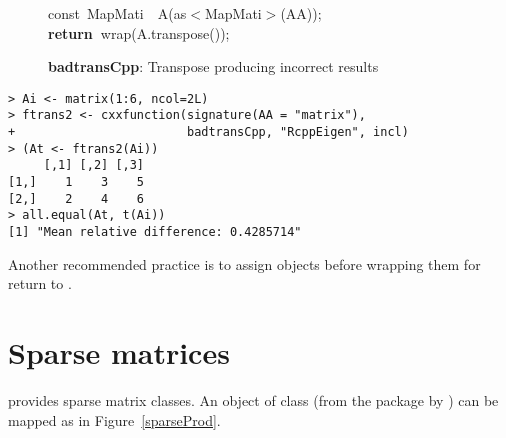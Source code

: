 \documentclass[shortnames,article]{jss}
\newcommand{\hlstd}[1]{\textcolor[rgb]{0,0,0}{#1}}
\newcommand{\hlopt}[1]{\textcolor[rgb]{0,0,0}{#1}}
\newcommand{\hlkwa}[1]{\textcolor[rgb]{0.61,0.13,0.93}{\bf{#1}}}
\newcommand{\hlkwb}[1]{\textcolor[rgb]{0.13,0.54,0.13}{#1}}
\newcommand{\hlkwd}[1]{\textcolor[rgb]{0,0,0}{#1}}
\begin{document}
\begin{figure}[htb]
  \noindent
  \ttfamily
  \hlstd{}\hlkwb{const\ }\hlstd{MapMati}\hlstd{\ \ }\hlstd{}\hlkwd{A}\hlstd{}\hlopt{(}\hlstd{as}\hlopt{$<$}\hlstd{MapMati}\hlopt{$>$(}\hlstd{AA}\hlopt{));}\hspace*{\fill}\\
  \hlstd{}\hlkwa{return\ }\hlstd{}\hlkwd{wrap}\hlstd{}\hlopt{(}\hlstd{A}\hlopt{.}\hlstd{}\hlkwd{transpose}\hlstd{}\hlopt{());}\hlstd{}\hspace*{\fill}\\
  \mbox{}
  \normalfont
  \normalsize
  \caption{\textbf{badtransCpp}: Transpose producing incorrect results}
  \label{badtrans}
\end{figure}
\begin{verbatim}
> Ai <- matrix(1:6, ncol=2L)
> ftrans2 <- cxxfunction(signature(AA = "matrix"), 
+                        badtransCpp, "RcppEigen", incl)
> (At <- ftrans2(Ai))
     [,1] [,2] [,3]
[1,]    1    3    5
[2,]    2    4    6
> all.equal(At, t(Ai))
[1] "Mean relative difference: 0.4285714"
\end{verbatim}

Another recommended practice is to assign objects before wrapping them
for return to .

\section{Sparse matrices}
\label{sec:sparse}

 provides sparse matrix classes.  An  object of
class  (from the  package by
\citet{CRAN:Matrix}) can be mapped as in Figure~\ref{sparseProd}.
\end{document}

